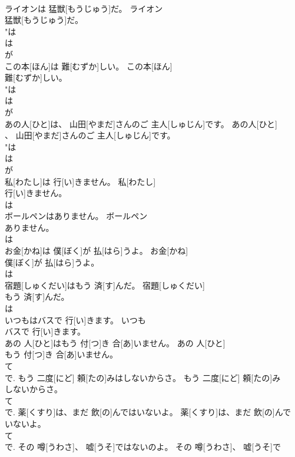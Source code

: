 \documentclass[8pt]{extreport}
\begin{document}
\begin{CJK}{UTF8}{min}
\\	ライオンは 猛獣[もうじゅう]だ。	ライオン
\\	猛獣[もうじゅう]だ。	
\\	"は 
\\	は 
\\	が 
\\	この本[ほん]は 難[むずか]しい。	この本[ほん]
\\	難[むずか]しい。	
\\	"は 
\\	は 
\\	が 
\\	あの人[ひと]は、 山田[やまだ]さんのご 主人[しゅじん]です。	あの人[ひと]
\\	、 山田[やまだ]さんのご 主人[しゅじん]です。	
\\	"は 
\\	は 
\\	が 
\\	私[わたし]は 行[い]きません。	私[わたし]
\\	行[い]きません。	
\\	は 
\\	ボールペンはありません。	ボールペン
\\	ありません。	
\\	は 
\\	お金[かね]は 僕[ぼく]が 払[はら]うよ。	お金[かね]
\\	僕[ぼく]が 払[はら]うよ。	
\\	は 
\\	宿題[しゅくだい]はもう 済[す]んだ。	宿題[しゅくだい]
\\	もう 済[す]んだ。	
\\	は 
\\	いつもはバスで 行[い]きます。	いつも
\\	バスで 行[い]きます。	
\\	あの 人[ひと]はもう 付[つ]き 合[あ]いません。	あの 人[ひと]
\\	もう 付[つ]き 合[あ]いません。	
\\	て 
\\	で.	もう 二度[にど] 頼[たの]みはしないからさ。	もう 二度[にど] 頼[たの]み
\\	しないからさ。	
\\	て 
\\	で.	薬[くすり]は、まだ 飲[の]んではいないよ。	薬[くすり]は、まだ 飲[の]んで
\\	いないよ。	
\\	て 
\\	で.	その 噂[うわさ]、 嘘[うそ]ではないのよ。	その 噂[うわさ]、 嘘[うそ]で

\end{CJK}
\end{document}
